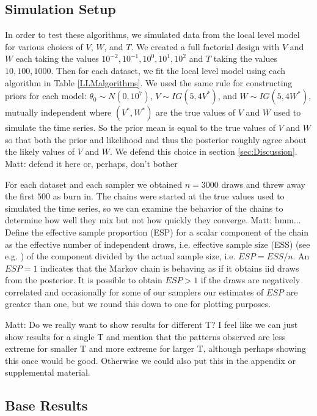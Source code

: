 \documentclass{article}
\newcommand{\matt}[1]{{\color{red} Matt: #1}}
\begin{document}
\subsection{Simulation Setup}

In order to test these algorithms, we simulated data from the local level model for various choices of $V$, $W$, and $T$. We created a full factorial design with $V$ and $W$ each taking the values $10^{-2}, 10^{-1}, 10^0, 10^1, 10^2$ and $T$ taking the values $10, 100, 1000$. Then for each dataset, we fit the local level model using each algorithm in Table \ref{LLMalgorithms}. We used the same rule for constructing priors for each model: $\theta_0\sim N(0,10^7)$, $V\sim IG(5, 4V^*)$, and $W\sim IG(5, 4W^*)$, mutually independent where $(V^*,W^*)$ are the true values of $V$ and $W$ used to simulate the time series. So the prior mean is equal to the true values of $V$ and $W$ so that both the prior and likelihood and thus the posterior roughly agree about the likely values of $V$ and $W$. We defend this choice in section \ref{sec:Discussion}. \matt{defend it here or, perhaps, don't bother}

For each dataset and each sampler we obtained $n=3000$ draws and threw away the first $500$ as burn in. The chains were started at the true values used to simulated the time series, so we can examine the behavior of the chains to determine how well they mix but not how quickly they converge. \matt{hmm...} Define the effective sample proportion (ESP) for a scalar component of the chain as the effective number of independent draws, i.e. effective sample size (ESS) (see e.g. \citet{gelman2003bayesian}) of the component divided by the actual sample size, i.e. $ESP=ESS/n$. An $ESP=1$ indicates that the Markov chain is behaving as if it obtains iid draws from the posterior. It is possible to obtain $ESP>1$ if the draws are negatively correlated and occasionally for some of our samplers our estimates of $ESP$ are greater than one, but we round this down to one for plotting purposes.


\matt{Do we really want to show results for different T? I feel like we can just show results for a single T and mention that the patterns observed are less extreme for smaller T and more extreme for larger T, although perhaps showing this once would be good. Otherwise we could also put this in the appendix or supplemental material.}

\subsection{Base Results}
\end{document}
